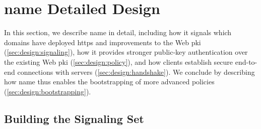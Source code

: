 
\section{\ac{name} Detailed Design}
In this section, we describe \ac{name} in detail, including how it signals which domains have
deployed \ac{https} and improvements to the Web \ac{pki}
(\autoref{sec:design:signaling}), how it provides stronger public-key
authentication over the existing Web \ac{pki} (\autoref{sec:design:policy}), and
how clients establish secure end-to-end connections with servers
(\autoref{sec:design:handshake}). We conclude by describing how \ac{name} thus
enables the bootstrapping of more advanced policies
(\autoref{sec:design:bootstrapping}).
\subsection{Building the Signaling Set}
\label{sec:design:signaling}

